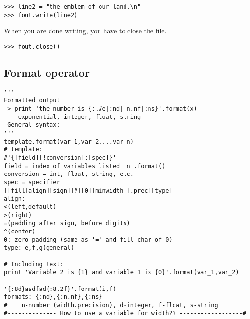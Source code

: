 \documentclass{article}
\begin{document}
\begin{verbatim}
>>> line2 = "the emblem of our land.\n"
>>> fout.write(line2)
\end{verbatim}

\par When you are done writing, you have to close the file.

\begin{verbatim}
>>> fout.close()
\end{verbatim}

\subsection{Format operator}

\begin{verbatim}
'''
Formatted output
 > print 'the number is {:.#e|:nd|:n.nf|:ns}'.format(x)
    exponential, integer, float, string
 General syntax:
'''
template.format(var_1,var_2,...var_n)
# template:
#'{[field][!conversion]:[spec]}'
field = index of variables listed in .format()
conversion = int, float, string, etc.
spec = specifier
[[fill]align][sign][#][0][minwidth][.prec][type]
align:
<(left,default)
>(right)
=(padding after sign, before digits)
^(center)
0: zero padding (same as '=' and fill char of 0)
type: e,f,g(general)

# Including text:
print 'Variable 2 is {1} and variable 1 is {0}'.format(var_1,var_2)

'{:8d}asdfad{:8.2f}'.format(i,f)
formats: {:nd},{:n.nf},{:ns}
#    n-number (width.precision), d-integer, f-float, s-string
#-------------- How to use a variable for width?? ------------------#
\end{verbatim}
\end{document}
